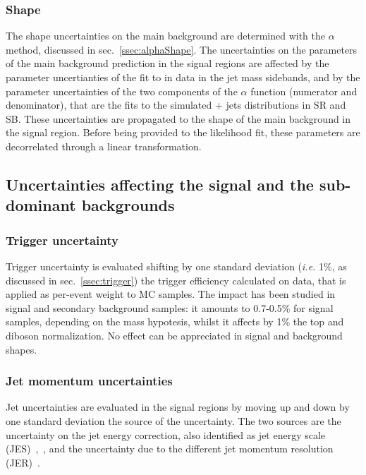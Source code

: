 \subsubsection{Shape}

The shape uncertainties on the main background are determined with the $\alpha$ method, discussed in sec.~\ref{ssec:alphaShape}. The uncertainties on the parameters of the main background prediction in the signal regions are affected by the parameter uncertianties of the fit to \mtVZ in data in the jet mass sidebands, and by the parameter uncertainties of the two components of the $\alpha$ function (numerator and denominator), that are the \mtVZ fits to the simulated \V + jets distributions in SR and SB. These uncertainties are propagated to the shape of the main background in the signal region. Before being provided to the likelihood fit, these parameters are decorrelated through a linear transformation.

\subsection{Uncertainties affecting the signal and the sub-dominant backgrounds}

\subsubsection{Trigger uncertainty}

Trigger uncertainty is evaluated shifting by one standard deviation (\textit{i.e.} 1\%, as discussed in sec.~\ref{ssec:trigger}) the \MET trigger efficiency calculated on data, that is applied as per-event weight to MC samples. The impact has been studied in signal and secondary background samples: it amounts to 0.7-0.5\% for signal samples, depending on the mass hypotesis, whilst it affects by 1\% the top and diboson normalization. No effect can be appreciated in signal and background shapes.

\subsubsection{Jet momentum uncertainties}

Jet uncertainties are evaluated in the signal regions by moving up and down by one standard deviation the source of the uncertainty. The two sources are the uncertainty on the jet energy correction, also identified as jet energy scale (JES)~\cite{bib:1748-0221-6-11-P11002},~\cite{CMS-DP-2016-020}, and the uncertainty due to the different jet momentum resolution (JER)~\cite{CMS-DP-2016-020}.


